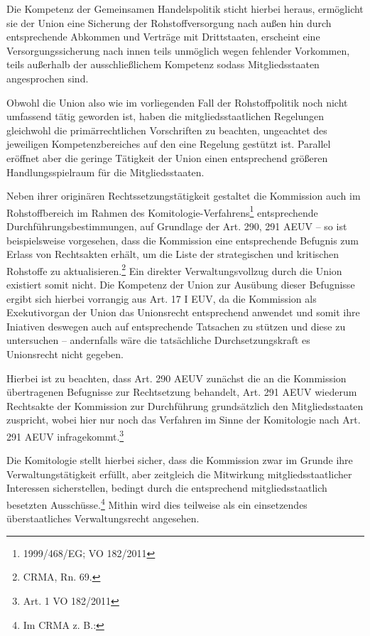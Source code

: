 \documentclass[12pt,a4paper,oneside]{book} %
\begin{document}
	Die Kompetenz der Gemeinsamen Handelspolitik sticht hierbei heraus, ermöglicht sie der Union eine Sicherung der Rohstoffversorgung nach außen hin durch entsprechende Abkommen und Verträge mit Drittstaaten, erscheint eine Versorgungssicherung nach innen teils unmöglich wegen fehlender Vorkommen, teils außerhalb der ausschließlichem Kompetenz sodass Mitgliedsstaaten angesprochen sind.
	
	Obwohl die Union also wie im vorliegenden Fall der Rohstoffpolitik noch nicht umfassend tätig geworden ist, haben die mitgliedsstaatlichen Regelungen gleichwohl die primärrechtlichen Vorschriften zu beachten, ungeachtet des jeweiligen Kompetenzbereiches auf den eine Regelung gestützt ist. Parallel eröffnet aber die geringe Tätigkeit der Union einen entsprechend größeren Handlungsspielraum für die Mitgliedsstaaten.
	
	Neben ihrer originären Rechtssetzungstätigkeit gestaltet die Kommission auch im Rohstoffbereich im Rahmen des Komitologie-Verfahrens\footnote{1999/468/EG; VO 182/2011} entsprechende Durchführungsbestimmungen, auf Grundlage der Art. 290, 291 AEUV -- so ist beispielsweise vorgesehen, dass die Kommission eine entsprechende Befugnis zum Erlass von Rechtsakten erhält, um die Liste der strategischen und kritischen Rohstoffe zu aktualisieren.\footnote{CRMA, Rn. 69.} Ein direkter Verwaltungsvollzug durch die Union existiert somit nicht. Die Kompetenz der Union zur Ausübung dieser Befugnisse ergibt sich hierbei vorrangig aus Art. 17 I EUV, da die Kommission als Exekutivorgan der Union\autocite{CITATIONNEEDED} das Unionsrecht entsprechend anwendet und somit ihre Iniativen deswegen auch auf entsprechende Tatsachen zu stützen und diese zu untersuchen -- andernfalls wäre die tatsächliche Durchsetzungskraft es Unionsrecht nicht gegeben.\autocite[siehe hierzu]{frau_2025_S. 407}
	
	Hierbei ist zu beachten, dass Art. 290 AEUV zunächst die an die Kommission übertragenen Befugnisse zur Rechtsetzung behandelt, Art. 291 AEUV wiederum Rechtsakte der Kommission zur Durchführung grundsätzlich den Mitgliedsstaaten zuspricht, wobei hier nur noch das Verfahren im Sinne der Komitologie nach Art. 291 AEUV infragekommt.\footnote{Art. 1 VO 182/2011}
	
	Die Komitologie stellt hierbei sicher, dass die Kommission zwar im Grunde ihre Verwaltungstätigkeit erfüllt, aber zeitgleich die Mitwirkung mitgliedsstaatlicher Interessen sicherstellen, bedingt durch die entsprechend mitgliedsstaatlich besetzten Ausschüsse.\footnote{Im CRMA z. B.: }%
	Mithin wird dies teilweise als ein einsetzendes überstaatliches Verwaltungsrecht angesehen.\autocite{von Sydow, Verwaltungskooperation S. 80 ff.}
	
\end{document}
